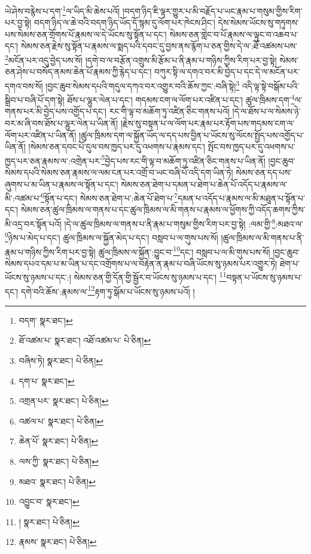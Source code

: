 ཡེ་ཤེས་བརྙེས་པ་དག་\footnote{བདག་  སྣར་ཐང་། }ལ་ཡིད་མི་ཆེས་པའོ། །བདག་ཉིད་ཇི་ལྟར་གྱུར་པ་མི་བརྗོད་པ་ཡང་རྣམ་པ་གསུམ་གྱིས་རིག་པར་བྱ་སྟེ། བདག་ཉིད་ལ་ཆེ་བའི་བདག་ཉིད་ཡོད་དོ་སྙམ་དུ་ལོག་པར་ཁེངས་ཤིང་། དེས་སེམས་ཡོངས་སུ་གཏུགས་པས་སེམས་ཅན་གྲོགས་པོ་རྣམས་ལ་དེ་ཡོངས་སུ་སྟོན་པ་དང་། སེམས་ཅན་གླེང་བ་པོ་རྣམས་ལ་ལྟུང་བ་འཆབ་པ་དང་། སེམས་ཅན་རྗེས་སུ་སྟོན་པ་རྣམས་ལ་སྨད་པའི་དབང་དུ་བྱས་ནས་རྙོག་པ་ཅན་གྱིས་དེ་ལ་:ཐོ་འཚམས་པས་\footnote{ཐོ་འཚམ་པ་  སྣར་ཐང་། འཐོ་འཚམ་པ་  པེ་ཅིན། }མངོན་པར་འདུ་བྱེད་པས་སོ། །དགེ་བ་ལ་བརྩོན་འགྲུས་མི་རྩོམ་པ་ནི་རྣམ་པ་གཉིས་ཀྱིས་རིག་པར་བྱ་སྟེ། སེམས་ཅན་ཤེས་པ་བསོད་ནམས་ཆེན་པོ་རྣམས་ཀྱི་རྙེད་པ་དང་། བཀུར་སྟི་ལ་དགའ་བར་མི་བྱེད་པ་དང་དེ་ལ་མངོན་པར་དགའ་བས་སོ། །བྱང་ཆུབ་སེམས་དཔའི་གདུལ་དཀའ་བར་འགྱུར་བའི་ཆོས་ཀྱང་:བཞི་སྟེ།\footnote{བཞིས་ཏེ།  སྣར་ཐང་།  པེ་ཅིན། } འདི་ལྟ་སྟེ་བསྒོམ་པའི་སྒྲིབ་པ་བཞི་པོ་དག་སྟེ། ཐོས་པ་ལྷུར་ལེན་པ་དང་། གདམས་ངག་ལ་ལོག་པར་འཛིན་པ་དང་། ཚུལ་ཁྲིམས་དག་\footnote{དག་པ་  སྣར་ཐང་། }ལ་གནས་པར་མི་བྱེད་པས་འགྱོད་པ་དང་། རང་གི་ལྟ་བ་མཆོག་ཏུ་འཛིན་ཅིང་གནས་པའོ། །དེ་ལ་ཐོས་པ་ལ་སེམས་ཉེ་བར་མ་ཞི་བས་ཐོས་པ་ལྷུར་ལེན་པ་ཡིན་ནོ། །རྗེས་སུ་བསྟན་པ་ལ་ལོག་པར་རྣམ་པར་རྟོག་པས་གདམས་ངག་ལ་ལོག་པར་འཛིན་པ་ཡིན་ནོ། །ཚུལ་ཁྲིམས་དག་ལ་སྐྱོན་ཡོད་ལ་དད་པས་བྱིན་པ་ཡོངས་སུ་ལོངས་སྤྱོད་པས་འགྱོད་པ་ཡིན་ནོ། །སེམས་ཅན་དབང་པོ་དུལ་བས་ཁྱད་པར་དུ་འཕགས་པ་རྣམས་དང་། སྤོང་བས་ཁྱད་པར་དུ་འཕགས་པ་ཁྱད་པར་ཅན་རྣམས་ལ་:འགྲེན་པར་\footnote{འགྲན་པར་  སྣར་ཐང་།  པེ་ཅིན། }བྱེད་པས་རང་གི་ལྟ་བ་མཆོག་ཏུ་འཛིན་ཅིང་གནས་པ་ཡིན་ནོ། །བྱང་ཆུབ་སེམས་དཔའི་སེམས་ཅན་རྣམས་ལ་ལམ་ངན་པར་འགྲོ་བ་ཡང་བཞི་པོ་འདི་དག་ཡིན་ཏེ། སེམས་ཅན་དད་པས་ཞུགས་པ་མ་ཡིན་པ་རྣམས་ལ་སྟོན་པ་དང་། སེམས་ཅན་ཐེག་པ་དམན་པ་ཐེག་པ་ཆེན་པོ་འདོད་པ་རྣམས་ལ་མི་:འཚམ་པ་\footnote{འཚལ་པ་  སྣར་ཐང་།  པེ་ཅིན། }སྟོན་པ་དང་། སེམས་ཅན་ཐེག་པ་:ཆེན་པོ་ཐེག་པ་\footnote{ཆེན་པོ་  སྣར་ཐང་།  པེ་ཅིན། }དམན་པ་འདོད་པ་རྣམས་ལ་མི་མཐུན་པ་སྟོན་པ་དང་། སེམས་ཅན་ཚུལ་ཁྲིམས་ལ་གནས་པ་དང་ཚུལ་ཁྲིམས་ལ་མི་གནས་པ་རྣམས་ལ་ཕྱོགས་ཀྱི་འདོད་ཆགས་ཀྱིས་མི་འདྲ་བར་སྟོན་པའོ། །དེ་ལ་ཚུལ་ཁྲིམས་ལ་གནས་པ་ནི་རྣམ་པ་གསུམ་གྱིས་རིག་པར་བྱ་སྟེ། :ལམ་གྱི་\footnote{ལས་ཀྱི་  སྣར་ཐང་།  པེ་ཅིན། }:མཐའ་ལ་\footnote{མཐའ་  སྣར་ཐང་།  པེ་ཅིན། }ཉེས་པ་མེད་པ་དང་། ཚུལ་ཁྲིམས་ལ་སྐྱོན་མེད་པ་དང་། བསླབ་པ་ལ་གུས་པས་སོ། །ཚུལ་ཁྲིམས་ལ་མི་གནས་པ་ནི་རྣམ་པ་གཉིས་ཀྱིས་རིག་པར་བྱ་སྟེ། ཚུལ་ཁྲིམས་ལ་སྐྱོན་:བྱུང་བ་\footnote{འབྱུང་བ་  སྣར་ཐང་། }དང་། བསླབ་པ་ལ་མི་གུས་པས་སོ། །བྱང་ཆུབ་སེམས་དཔའ་དམ་པ་མ་ཡིན་པ་དང་འགྲོགས་པ་ལ་བརྟེན་ན་རྣམ་པ་བཞི་ཡོངས་སུ་ཉམས་པར་འགྱུར་ཏེ། ཐེག་པ་ཡོངས་སུ་ཉམས་པ་དང་:། སེམས་ཅན་གྱི་དོན་གྱི་སྦྱོར་བ་ཡོངས་སུ་ཉམས་པ་དང་། \footnote{།    སྣར་ཐང་།  པེ་ཅིན། }བསྟན་པ་ཡོངས་སུ་ཉམས་པ་དང་། དགེ་བའི་ཆོས་:རྣམས་ལ་\footnote{རྣམས་  སྣར་ཐང་།  པེ་ཅིན། }རྟག་ཏུ་སྒོམ་པ་ཡོངས་སུ་ཉམས་པའོ། །
